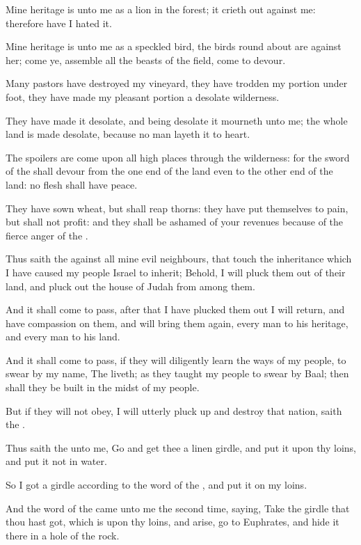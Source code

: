 \Verse Mine heritage is unto me as a lion in the forest; it crieth out against me: therefore have I hated it.

\Verse Mine heritage is unto me as a speckled bird, the birds round about are against her; come ye, assemble all the beasts of the field, come to devour.

\Verse Many pastors have destroyed my vineyard, they have trodden my portion under foot, they have made my pleasant portion a desolate wilderness.

\Verse They have made it desolate, and being desolate it mourneth unto me; the whole land is made desolate, because no man layeth it to heart.

\Verse The spoilers are come upon all high places through the wilderness: for the sword of the \LORD shall devour from the one end of the land even to the other end of the land: no flesh shall have peace.

\Verse They have sown wheat, but shall reap thorns: they have put themselves to pain, but shall not profit: and they shall be ashamed of your revenues because of the fierce anger of the \LORD.

\Verse Thus saith the \LORD against all mine evil neighbours, that touch the inheritance which I have caused my people Israel to inherit; Behold, I will pluck them out of their land, and pluck out the house of Judah from among them.

\Verse And it shall come to pass, after that I have plucked them out I will return, and have compassion on them, and will bring them again, every man to his heritage, and every man to his land.

\Verse And it shall come to pass, if they will diligently learn the ways of my people, to swear by my name, The \LORD liveth; as they taught my people to swear by Baal; then shall they be built in the midst of my people.

\Verse But if they will not obey, I will utterly pluck up and destroy that nation, saith the \LORD.


\Chapter
\Verse Thus saith the \LORD unto me, Go and get thee a linen girdle, and put it upon thy loins, and put it not in water.

\Verse So I got a girdle according to the word of the \LORD, and put it on my loins.

\Verse And the word of the \LORD came unto me the second time, saying, \Verse Take the girdle that thou hast got, which is upon thy loins, and arise, go to Euphrates, and hide it there in a hole of the rock.

